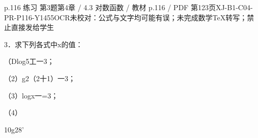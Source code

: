 \begin{bankitem}{p.116 练习 第3题}{第4章 / 4.3 对数函数 / 教材 p.116 / PDF 第123页}{XJ-B1-C04-PR-P116-Y1455}{OCR未校对：公式与文字均可能有误；未完成数学TeX转写；禁止直接发给学生}
\begin{ocrdraft}
\par
3．求下列各式中x的值：
\par
（Dlog5工一3；
\par
（2）g2（2十1）一3；
\par
（3）logx一=3；
\par
（4）
\par
10g28'
\end{ocrdraft}
\end{bankitem}
